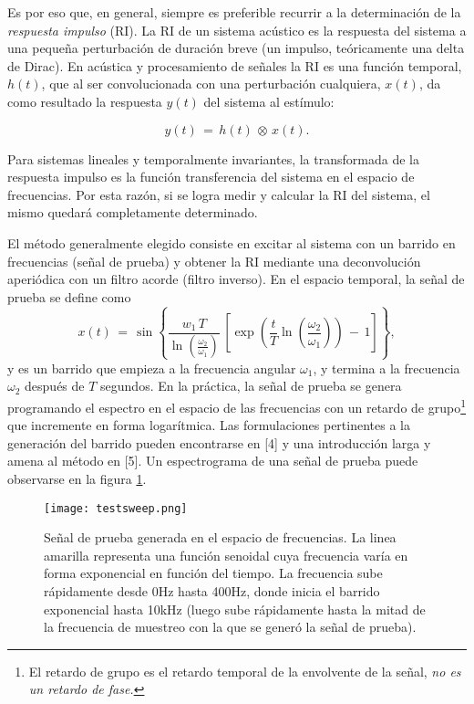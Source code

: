 Es por eso que, en general, siempre es preferible recurrir a la determinación de la \emph{respuesta impulso} (RI). La RI de un sistema acústico es la respuesta del sistema a una pequeña perturbación de duración breve (un impulso, teóricamente una delta de Dirac). En acústica y procesamiento de señales la RI es una función temporal, $h(t)$, que al ser convolucionada con una perturbación cualquiera, $x(t)$, da como resultado la respuesta $y(t)$ del sistema al estímulo:

\begin{equation}
	y(t)\,=\,h(t)\,\otimes\,x(t).
\end{equation}

Para sistemas lineales y temporalmente invariantes, la transformada de la respuesta impulso es la función transferencia del sistema en el espacio de frecuencias. Por esta razón, si se logra medir y calcular la RI  del sistema, el mismo quedará completamente determinado.

El método generalmente elegido consiste en excitar al sistema con un barrido en frecuencias (señal de prueba) y obtener la RI mediante una deconvolución aperiódica con un filtro acorde (filtro inverso). En el espacio temporal, la señal de prueba se define como
\begin{equation}
	x(t)\,=\,\sin
	\left\lbrace
	\frac{w_1\,T}{\ln \left(\frac{\omega_2}{\omega_1}\right)}\,
	\left[\exp 
			\left(\frac{t}{T}\ln \left(\frac{\omega_2}{\omega_1}\right)
	\right)\,-\,1\right]
	\right\rbrace,
\end{equation}
y es un barrido que empieza a la frecuencia angular $\omega_1$, y termina a la frecuencia $\omega_2$ después de $T$ segundos. En la práctica, la señal de prueba se genera programando el espectro en el espacio de las frecuencias con un retardo de grupo\footnote{El retardo de grupo es el retardo temporal de la envolvente de la señal, \emph{no es un retardo de fase.}} que incremente en forma logarítmica. Las formulaciones pertinentes a la generación del barrido pueden encontrarse en [4] y una introducción larga y amena al método en [5]. Un espectrograma de una señal de prueba puede observarse en la figura \ref{fig:testsweep}.

\begin{figure}[H]
	\centering
		\texttt{[image: testsweep.png]}
		\caption{Señal de prueba generada en el espacio de frecuencias. La linea amarilla representa una función senoidal cuya frecuencia varía en forma exponencial en función del tiempo. La frecuencia sube rápidamente desde 0Hz hasta 400Hz, donde inicia el barrido exponencial hasta 10kHz (luego sube rápidamente hasta la mitad de la frecuencia de muestreo con la que se generó la señal de prueba).}
	\label{fig:testsweep}
\end{figure}

